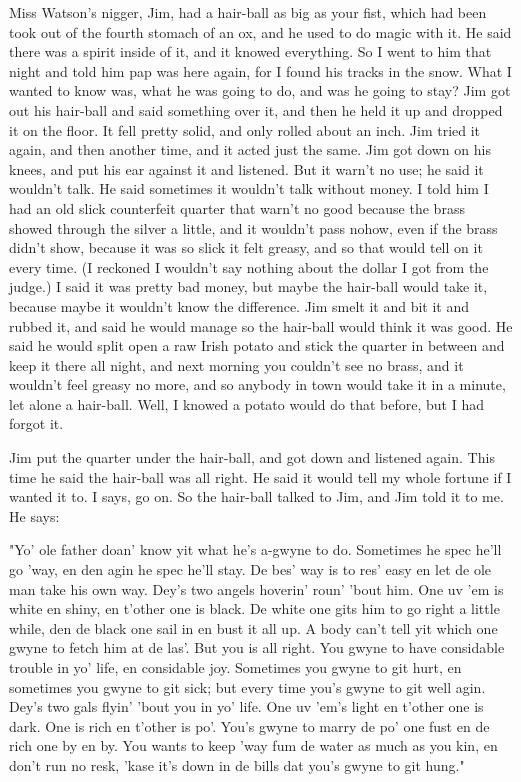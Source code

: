 Miss Watson's nigger, Jim, had a hair-ball as big as your fist, which had
been took out of the fourth stomach of an ox, and he used to do magic
with it.  He said there was a spirit inside of it, and it knowed
everything.  So I went to him that night and told him pap was here again,
for I found his tracks in the snow.  What I wanted to know was, what he
was going to do, and was he going to stay?  Jim got out his hair-ball and
said something over it, and then he held it up and dropped it on the
floor.  It fell pretty solid, and only rolled about an inch.  Jim tried
it again, and then another time, and it acted just the same.  Jim got
down on his knees, and put his ear against it and listened.  But it
warn't no use; he said it wouldn't talk. He said sometimes it wouldn't
talk without money.  I told him I had an old slick counterfeit quarter
that warn't no good because the brass showed through the silver a little,
and it wouldn't pass nohow, even if the brass didn't show, because it was
so slick it felt greasy, and so that would tell on it every time.  (I
reckoned I wouldn't say nothing about the dollar I got from the judge.) I
said it was pretty bad money, but maybe the hair-ball would take it,
because maybe it wouldn't know the difference.  Jim smelt it and bit it
and rubbed it, and said he would manage so the hair-ball would think it
was good.  He said he would split open a raw Irish potato and stick the
quarter in between and keep it there all night, and next morning you
couldn't see no brass, and it wouldn't feel greasy no more, and so
anybody in town would take it in a minute, let alone a hair-ball.  Well,
I knowed a potato would do that before, but I had forgot it.

Jim put the quarter under the hair-ball, and got down and listened again.
This time he said the hair-ball was all right.  He said it would tell my
whole fortune if I wanted it to.  I says, go on.  So the hair-ball talked
to Jim, and Jim told it to me.  He says:

"Yo' ole father doan' know yit what he's a-gwyne to do.  Sometimes he
spec he'll go 'way, en den agin he spec he'll stay.  De bes' way is to
res' easy en let de ole man take his own way.  Dey's two angels hoverin'
roun' 'bout him.  One uv 'em is white en shiny, en t'other one is black.
De white one gits him to go right a little while, den de black one sail
in en bust it all up.  A body can't tell yit which one gwyne to fetch him
at de las'.  But you is all right.  You gwyne to have considable trouble
in yo' life, en considable joy.  Sometimes you gwyne to git hurt, en
sometimes you gwyne to git sick; but every time you's gwyne to git well
agin.  Dey's two gals flyin' 'bout you in yo' life.  One uv 'em's light
en t'other one is dark. One is rich en t'other is po'.  You's gwyne to
marry de po' one fust en de rich one by en by.  You wants to keep 'way
fum de water as much as you kin, en don't run no resk, 'kase it's down in
de bills dat you's gwyne to git hung."

